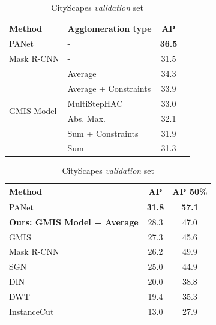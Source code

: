 \captionsetup[subtable]{labelformat=simple, labelsep=space, justification=centering, singlelinecheck=off}
\renewcommand*{\thesubtable}{(\alph{subtable})}
\begin{table}[t]
\centering
\begin{subtable}{0.5 \textwidth}
    \centering
    \scriptsize
        \begin{tabular}{l|l|cc}
            Method & Agglomeration type & AP \\ \midrule
            PANet \cite{liu2018path} & - & \textbf{36.5} \\
            Mask R-CNN \cite{he2017mask} & - & 31.5 \\ \hline
             & \algname{} Average& 34.3 \\
             & \algname{} Average + Constraints & 33.9 \\
            \multirow{2}{*}{GMIS Model \cite{liu2018affinity}} & MultiStepHAC \cite{liu2018affinity} & 33.0 \\
             & \algname{} Abs. Max. \cite{wolf2018mutex}  & 32.1 \\
             & \algname{} Sum + Constraints  \cite{levinkov2017comparative} & 31.9  \\
             & \algname{} Sum \cite{keuper2015efficient} & 31.3 \\
        \end{tabular}
    \caption{CityScapes \emph{validation} set}
    \label{tab:results_cityscapes_val}
\end{subtable}\hfill
\begin{subtable}{0.46\textwidth}
\centering
    \scriptsize
\begin{tabular}{l|cc}
           Method & AP  & AP 50\% \\ \midrule
           PANet \cite{liu2018path} & \textbf{31.8} & \textbf{57.1} \\
           \textbf{Ours: GMIS Model + \algname{} Average} & 28.3 & 47.0 \\ 
           GMIS \cite{liu2018affinity} & 27.3 & 45.6 \\
           Mask R-CNN \cite{he2017mask} & 26.2 & 49.9 \\
           SGN \cite{liu2017sgn} & 25.0 & 44.9 \\
           DIN \cite{arnab2017pixelwise} & 20.0 & 38.8 \\
           DWT \cite{bai2017deep} & 19.4 & 35.3 \\
           InstanceCut \cite{kirillov2017instancecut} & 13.0 & 27.9 \\

\end{tabular}
\end{subtable}
\end{table}
